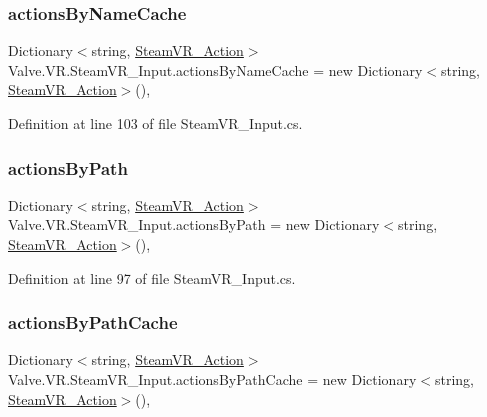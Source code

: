 \subsubsection{\texorpdfstring{actionsByNameCache}{actionsByNameCache}}
{\footnotesize\ttfamily Dictionary$<$string, \mbox{\hyperlink{class_valve_1_1_v_r_1_1_steam_v_r___action}{Steam\+V\+R\+\_\+\+Action}}$>$ Valve.\+V\+R.\+Steam\+V\+R\+\_\+\+Input.\+actions\+By\+Name\+Cache = new Dictionary$<$string, \mbox{\hyperlink{class_valve_1_1_v_r_1_1_steam_v_r___action}{Steam\+V\+R\+\_\+\+Action}}$>$()\hspace{0.3cm}{\ttfamily [static]}, {\ttfamily [protected]}}



Definition at line 103 of file Steam\+V\+R\+\_\+\+Input.\+cs.

\mbox{\label{class_valve_1_1_v_r_1_1_steam_v_r___input_a01fc292d2f7dc293fa90804aad062888}} 
\subsubsection{\texorpdfstring{actionsByPath}{actionsByPath}}
{\footnotesize\ttfamily Dictionary$<$string, \mbox{\hyperlink{class_valve_1_1_v_r_1_1_steam_v_r___action}{Steam\+V\+R\+\_\+\+Action}}$>$ Valve.\+V\+R.\+Steam\+V\+R\+\_\+\+Input.\+actions\+By\+Path = new Dictionary$<$string, \mbox{\hyperlink{class_valve_1_1_v_r_1_1_steam_v_r___action}{Steam\+V\+R\+\_\+\+Action}}$>$()\hspace{0.3cm}{\ttfamily [static]}, {\ttfamily [protected]}}



Definition at line 97 of file Steam\+V\+R\+\_\+\+Input.\+cs.

\mbox{\label{class_valve_1_1_v_r_1_1_steam_v_r___input_aa5d9bed4bfa6fa55db30255a164f449f}} 
\subsubsection{\texorpdfstring{actionsByPathCache}{actionsByPathCache}}
{\footnotesize\ttfamily Dictionary$<$string, \mbox{\hyperlink{class_valve_1_1_v_r_1_1_steam_v_r___action}{Steam\+V\+R\+\_\+\+Action}}$>$ Valve.\+V\+R.\+Steam\+V\+R\+\_\+\+Input.\+actions\+By\+Path\+Cache = new Dictionary$<$string, \mbox{\hyperlink{class_valve_1_1_v_r_1_1_steam_v_r___action}{Steam\+V\+R\+\_\+\+Action}}$>$()\hspace{0.3cm}{\ttfamily [static]}, {\ttfamily [protected]}}




